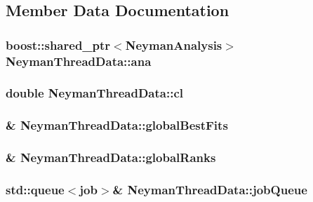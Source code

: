 \subsection{Member Data Documentation}
\hypertarget{structNeymanThreadData_a4b9b47c80fd8fa5ea300485a923f2348}{
\subsubsection[{ana}]{\setlength{\rightskip}{0pt plus 5cm}boost\-::shared\-\_\-ptr$<${\bf Neyman\-Analysis}$>$ Neyman\-Thread\-Data\-::ana}}\label{structNeymanThreadData_a4b9b47c80fd8fa5ea300485a923f2348}
\hypertarget{structNeymanThreadData_af145feca7df9e9c5c88bec759d97ba8f}{
\subsubsection[{cl}]{\setlength{\rightskip}{0pt plus 5cm}double Neyman\-Thread\-Data\-::cl}}\label{structNeymanThreadData_af145feca7df9e9c5c88bec759d97ba8f}
\hypertarget{structNeymanThreadData_a5de558380b8e1c7c08960526d91d8841}{
\subsubsection[{global\-Best\-Fits}]{\& Neyman\-Thread\-Data\-::global\-Best\-Fits}}\label{structNeymanThreadData_a5de558380b8e1c7c08960526d91d8841}
\hypertarget{structNeymanThreadData_a800f5dd68444c0ec9654946105759afc}{
\subsubsection[{global\-Ranks}]{\& Neyman\-Thread\-Data\-::global\-Ranks}}\label{structNeymanThreadData_a800f5dd68444c0ec9654946105759afc}
\hypertarget{structNeymanThreadData_ad7e388c9438a16640110fbe9018fda90}{
\subsubsection[{job\-Queue}]{\setlength{\rightskip}{0pt plus 5cm}std\-::queue$<${\bf job}$>$\& Neyman\-Thread\-Data\-::job\-Queue}}\label{structNeymanThreadData_ad7e388c9438a16640110fbe9018fda90}
